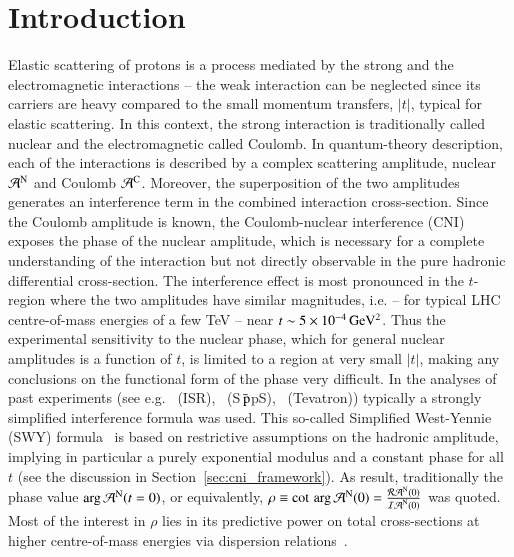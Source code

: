 \section{Introduction}
%
Elastic scattering of protons is a process mediated by the strong and the electromagnetic interactions -- the weak interaction can be neglected since its carriers are heavy compared to the small momentum transfers, $|t|$, typical for elastic scattering. In this context, the strong interaction is traditionally called nuclear and the electromagnetic called Coulomb. In quantum-theory description, each of the interactions is described by a complex scattering amplitude, nuclear ${\cal A}^{\rm N}$ and Coulomb ${\cal A}^{\rm C}$. Moreover, the superposition 
of the two amplitudes generates an interference term in the combined interaction cross-section. 
Since the Coulomb amplitude is known, the Coulomb-nuclear interference (CNI) exposes the phase of the nuclear amplitude, which is necessary for a complete understanding of the interaction but not directly observable in the pure hadronic differential cross-section. The interference effect is most pronounced in the $t$-region where the two amplitudes have similar magnitudes, i.e. -- for typical LHC centre-of-mass energies of a few TeV -- near $t \sim 5 \times 10^{-4}\,\rm GeV^{2}$. Thus the experimental sensitivity to 
the nuclear phase, which for general nuclear amplitudes is a function of $t$, 
is limited to a region at very small $|t|$, making any conclusions on the 
functional form of the phase very difficult.
In the analyses of past experiments (see e.g.~\cite{plb43,plb66,npb141,prl47,plb115,plb120,plb128,npb262} 
(ISR),~\cite{plb198,plb316} (S$\bar{\,{\rm p}}$pS),~\cite{prl68} (Tevatron)) 
typically a strongly simplified interference formula was used. This so-called
Simplified West-Yennie (SWY) formula~\cite{wy68} is based on restrictive assumptions on the 
hadronic amplitude, implying in particular a purely exponential modulus and a 
constant phase for all $t$ (see the discussion in 
Section~\ref{sec:cni_framework}).
As result, traditionally the phase value $\arg {\cal A}^{\rm N} (t=0)$, or
equivalently, $\rho \equiv \cot \, \arg {\cal A}^{\rm N} (0) = \frac{{\cal R A}^{\rm N} (0)}{{\cal I A}^{\rm N} (0)}$ was quoted. 
Most of the interest in $\rho$ lies in its predictive power on total cross-sections at higher centre-of-mass energies via dispersion 
relations~\cite{dremin-dispersion}. 

